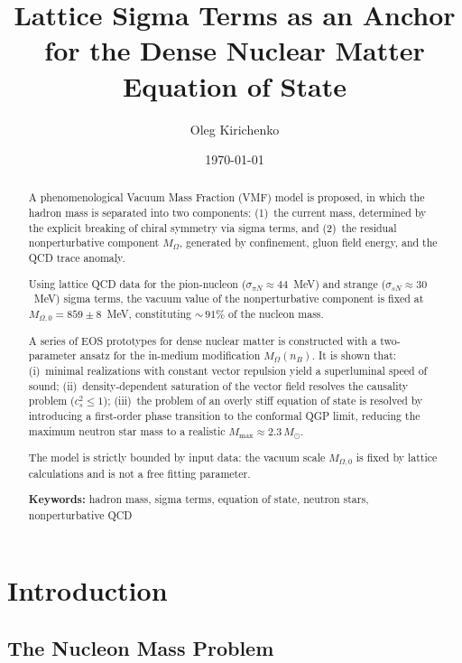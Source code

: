 \documentclass[11pt,a4paper]{article}
\title{\textbf{Lattice Sigma Terms as an Anchor\\for the Dense Nuclear Matter Equation of State}}
\author{Oleg Kirichenko}
\affil{Independent Researcher; \texttt{urevich55@gmail.com}}
\date{\today}
\begin{document}
\maketitle

\begin{abstract}
A phenomenological Vacuum Mass Fraction (VMF) model is proposed, in which the hadron mass is separated into two components: (1)~the current mass, determined by the explicit breaking of chiral symmetry via sigma terms, and (2)~the residual nonperturbative component $M_\Omega$, generated by confinement, gluon field energy, and the QCD trace anomaly.

Using lattice QCD data for the pion-nucleon ($\sigma_{\pi N} \approx 44$~MeV) and strange ($\sigma_{sN} \approx 30$~MeV) sigma terms, the vacuum value of the nonperturbative component is fixed at $M_{\Omega,0} = 859 \pm 8$~MeV, constituting ${\sim}\,91\%$ of the nucleon mass.

A series of EOS prototypes for dense nuclear matter is constructed with a two-parameter ansatz for the in-medium modification $M_\Omega(n_B)$. It is shown that: (i)~minimal realizations with constant vector repulsion yield a superluminal speed of sound; (ii)~density-dependent saturation of the vector field resolves the causality problem ($c_s^2 \leq 1$); (iii)~the problem of an overly stiff equation of state is resolved by introducing a first-order phase transition to the conformal QGP limit, reducing the maximum neutron star mass to a realistic $M_{\max} \approx 2.3\,M_\odot$.

The model is strictly bounded by input data: the vacuum scale $M_{\Omega,0}$ is fixed by lattice calculations and is not a free fitting parameter.

\medskip
\noindent\textbf{Keywords:} hadron mass, sigma terms, equation of state, neutron stars, nonperturbative QCD
\end{abstract}

\tableofcontents

\section{Introduction}
\label{sec:intro}

\subsection{The Nucleon Mass Problem}
\end{document}

